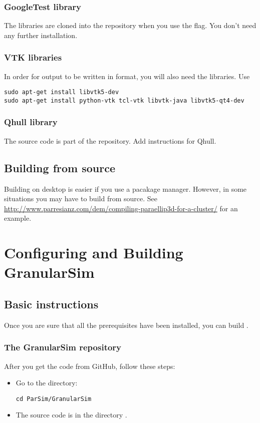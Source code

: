 \documentclass[11pt,fleqn]{book} %
\begin{document}
\subsection{GoogleTest library}
The  libraries are cloned into the repository when you use
the  flag.  You don't need any further installation.

\subsection{VTK libraries}
In order for output to be written in \VTK format, you will also need the  libraries. Use
\begin{lstlisting}[backgroundcolor=\color{background}]
sudo apt-get install libvtk5-dev
sudo apt-get install python-vtk tcl-vtk libvtk-java libvtk5-qt4-dev
\end{lstlisting}

\subsection{Qhull library}
The  source code is part of the repository. {\Red Add instructions for Qhull.}

\section{Building from source} \label{sec:build_from_src}
Building on desktop is easier if you use a pacakage manager.  However, in some situations you may have to 
build from source.  {\Red See \url{http://www.parresianz.com/dem/compiling-paraellip3d-for-a-cluster/}} for
an example.

\chapter{Configuring and Building GranularSim}

\section{Basic instructions}
Once you are sure that all the prerequisites have been installed, you can build \GranularSim.

\subsection{ The GranularSim repository}
After you get the code from GitHub, follow these steps:
\begin{itemize}
  \item Go to the  directory:

\begin{lstlisting}[backgroundcolor=\color{background}]
     cd ParSim/GranularSim
\end{lstlisting}

  \item  The source code is in the directory .
\end{itemize}
\end{document}
